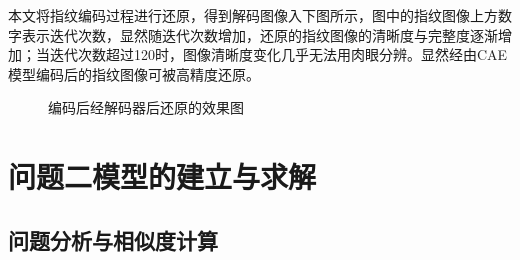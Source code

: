 \documentclass{whutmod}
\begin{document}
\begin{itemize}
    本文将指纹编码过程进行还原，得到解码图像入下图所示，图中的指纹图像上方数字表示迭代次数，显然随迭代次数增加，还原的指纹图像的清晰度与完整度逐渐增加；当迭代次数超过120时，图像清晰度变化几乎无法用肉眼分辨。显然经由CAE模型编码后的指纹图像可被高精度还原。
       	\begin{figure}[H]	
        	\centering
        	\caption{编码后经解码器后还原的效果图}
        	\label{zhiwen}
        \end{figure}
    
    

	\section{问题二模型的建立与求解}
		\subsection{问题分析与相似度计算}



\end{itemize}
\end{document}
